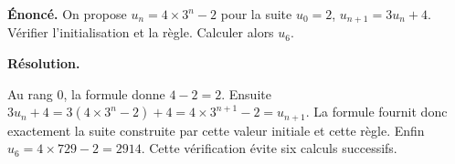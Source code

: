 \documentclass[11pt,a4paper]{article}
\begin{document}
\par\noindent\begin{minipage}{\linewidth}
{\small\color{Muted}\textbf{Énoncé.} On propose $u_n=4\times3^n-2$ pour la suite $u_0=2$, $u_{n+1}=3u_n+4$. Vérifier l’initialisation et la règle. Calculer alors $u_6$.}
\par\medskip
\textbf{Résolution.}\par
Au rang $0$, la formule donne $4-2=2$. Ensuite $3u_n+4=3(4\times3^n-2)+4=4\times3^{n+1}-2=u_{n+1}$. La formule fournit donc exactement la suite construite par cette valeur initiale et cette règle. Enfin $u_6=4\times729-2=2914$. Cette vérification évite six calculs successifs.
\end{minipage}\par
\end{document}
